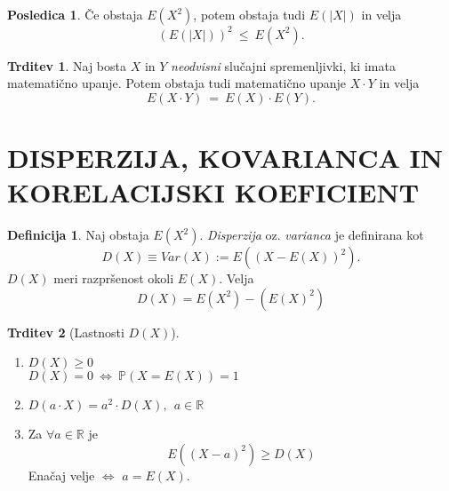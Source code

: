 \documentclass[11pt]{article}
\theoremstyle{definition}
\newtheorem{definicija}{Definicija}[section]
\theoremstyle{definition}
\newtheorem{trditev}{Trditev}[section]
\theoremstyle{definition}
\newtheorem*{posledica}{Posledica}
\begin{document}
\begin{posledica}

Če obstaja $E(X^2)$, potem obstaja tudi $E(|X|)$ in velja
$$(E(|X|))^2 ~\leq~ E(X^2).$$

\end{posledica}
\vspace{0.5cm}

\begin{trditev}

Naj bosta $X$ in $Y$ \textit{neodvisni} slučajni spremenljivki, ki imata matematično upanje. Potem obstaja tudi matematično upanje $X \cdot Y$ in velja
$$E(X \cdot Y) ~=~ E(X) \cdot E(Y).$$

\end{trditev}
\vspace{0.5cm}

\pagebreak


\section{DISPERZIJA, KOVARIANCA IN KORELACIJSKI KOEFICIENT}
\vspace{0.5cm}

\begin{definicija}

Naj obstaja $E(X^2)$. \textit{Disperzija} oz. \textit{varianca} je definirana kot
$$D(X) \equiv Var(X) := E((X - E(X))^2).$$
$D(X)$ meri razpršenost okoli $E(X)$. Velja
$$D(X) = E(X^2) - (E(X)^2)$$

\end{definicija}
\vspace{0.5cm}

\begin{trditev}[Lastnosti $D(X)$]
~\\
\begin{enumerate}
	\item $D(X) \geq 0$ \\
	$D(X) = 0 ~\Leftrightarrow~ \mathbb{P}(X = E(X)) = 1$
	\item $D(a \cdot X) = a^2 \cdot D(X), ~~a \in \mathbb{R}$
	\item Za $\forall a \in \mathbb{R}$ je 
	$$E((X - a)^2) \geq D(X)$$
	Enačaj velje $\Leftrightarrow$ $a = E(X)$.
\end{enumerate}

\end{trditev}
\vspace{0.5cm}
\end{document}
